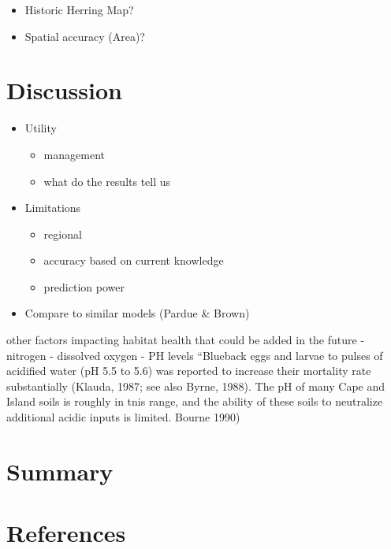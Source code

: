\documentclass[
]{book}
\providecommand{\tightlist}{%
  \setlength{\itemsep}{0pt}\setlength{\parskip}{0pt}}
\begin{document}
\begin{itemize}
\tightlist
\item
  Historic Herring Map?
\item
  Spatial accuracy (Area)?
\end{itemize}

\hypertarget{discussion}{%
\chapter{Discussion}\label{discussion}}

\begin{itemize}
\tightlist
\item
  Utility

  \begin{itemize}
  \tightlist
  \item
    management
  \item
    what do the results tell us
  \end{itemize}
\item
  Limitations

  \begin{itemize}
  \tightlist
  \item
    regional
  \item
    accuracy based on current knowledge
  \item
    prediction power
  \end{itemize}
\item
  Compare to similar models (Pardue \& Brown)
\end{itemize}

other factors impacting habitat health that could be added in the future
- nitrogen
- dissolved oxygen
- PH levels
``Blueback eggs and larvae to pulses of acidified water
(pH 5.5 to 5.6) was reported to increase their
mortality rate substantially (Klauda, 1987; see also
Byrne, 1988). The pH of many Cape and Island soils is
roughly in tnis range, and the ability of these soils
to neutralize additional acidic inputs is limited. Bourne 1990)

\hypertarget{summary}{%
\chapter{Summary}\label{summary}}

\hypertarget{references}{%
\chapter*{References}\label{references}}
\end{document}

